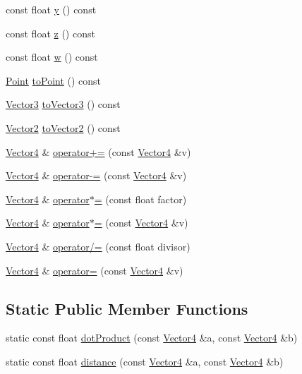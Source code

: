\begin{DoxyCompactItemize}
\item 
const float \hyperlink{classprism_1_1_vector4_ad865f8e0bf0379640510d0be932ba099}{y} () const 
\item 
const float \hyperlink{classprism_1_1_vector4_ae910baf9cdab3dbdf7add459a34c704c}{z} () const 
\item 
const float \hyperlink{classprism_1_1_vector4_a099427d4aea1e37acadc3557d04a1d4c}{w} () const 
\item 
\hyperlink{classprism_1_1_point}{Point} \hyperlink{classprism_1_1_vector4_a8df7c9df36666029ea8ec11bc60ac770}{to\+Point} () const 
\item 
\hyperlink{classprism_1_1_vector3}{Vector3} \hyperlink{classprism_1_1_vector4_a9631fa0ee3fb9084a5972f4017f1af9a}{to\+Vector3} () const 
\item 
\hyperlink{classprism_1_1_vector2}{Vector2} \hyperlink{classprism_1_1_vector4_a42846c7b395f3a5fb871312c589de696}{to\+Vector2} () const 
\item 
\hyperlink{classprism_1_1_vector4}{Vector4} \& \hyperlink{classprism_1_1_vector4_a85950554e524d66787b739fcda1eca37}{operator+=} (const \hyperlink{classprism_1_1_vector4}{Vector4} \&v)
\item 
\hyperlink{classprism_1_1_vector4}{Vector4} \& \hyperlink{classprism_1_1_vector4_a3db55ff03e06480f3207ea972131eb70}{operator-\/=} (const \hyperlink{classprism_1_1_vector4}{Vector4} \&v)
\item 
\hyperlink{classprism_1_1_vector4}{Vector4} \& \hyperlink{classprism_1_1_vector4_a3a7a402c78f84bbacc05c9c646d7321b}{operator$\ast$=} (const float factor)
\item 
\hyperlink{classprism_1_1_vector4}{Vector4} \& \hyperlink{classprism_1_1_vector4_a5df773b017400e73e3a382031f4dfbbb}{operator$\ast$=} (const \hyperlink{classprism_1_1_vector4}{Vector4} \&v)
\item 
\hyperlink{classprism_1_1_vector4}{Vector4} \& \hyperlink{classprism_1_1_vector4_a15c9175cd6f21bd16b8190b2f95a2831}{operator/=} (const float divisor)
\item 
\hyperlink{classprism_1_1_vector4}{Vector4} \& \hyperlink{classprism_1_1_vector4_ab5fd4c3877c4f870b84254515a8319a7}{operator=} (const \hyperlink{classprism_1_1_vector4}{Vector4} \&v)
\end{DoxyCompactItemize}
\subsection*{Static Public Member Functions}
\begin{DoxyCompactItemize}
\item 
static const float \hyperlink{classprism_1_1_vector4_a8763a9b8659f01d4864225d561814789}{dot\+Product} (const \hyperlink{classprism_1_1_vector4}{Vector4} \&a, const \hyperlink{classprism_1_1_vector4}{Vector4} \&b)
\item 
static const float \hyperlink{classprism_1_1_vector4_aa69f532e68d32181a291d74bb108717d}{distance} (const \hyperlink{classprism_1_1_vector4}{Vector4} \&a, const \hyperlink{classprism_1_1_vector4}{Vector4} \&b)
\end{DoxyCompactItemize}
